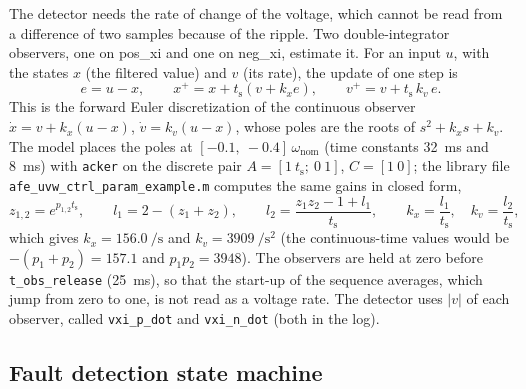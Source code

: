 \documentclass[11pt,a4paper]{scrartcl}
\newcommand{\ped}[1]{_{\mathrm{#1}}}
\newcommand{\code}[1]{\texttt{#1}}
\begin{document}
\begin{onehalfspace}
The detector needs the rate of change of the voltage, which cannot be read from a difference of two samples because of the ripple. Two double-integrator observers, one on pos\_xi and one on neg\_xi, estimate it. For an input $u$, with the states $x$ (the filtered value) and $v$ (its rate), the update of one step is
\begin{equation}
	e = u - x, \qquad x^{+} = x + t\ped{s}\left(v + k_x e\right), \qquad v^{+} = v + t\ped{s}\, k_v\, e.
	\label{eq:obs}
\end{equation}
This is the forward Euler discretization of the continuous observer $\dot{x} = v + k_x(u - x)$, $\dot{v} = k_v(u - x)$, whose poles are the roots of $s^2 + k_x s + k_v$. The model places the poles at $[-0.1,\ -0.4]\,\omega\ped{nom}$ (time constants \SI{32}{\milli\second} and \SI{8}{\milli\second}) with \code{acker} on the discrete pair $A = [1\ t\ped{s};\ 0\ 1]$, $C = [1\ 0]$; the library file \code{afe\_uvw\_ctrl\_param\_example.m} computes the same gains in closed form,
\begin{equation}
	z_{1,2} = e^{p_{1,2} t\ped{s}}, \qquad l_1 = 2 - (z_1 + z_2), \qquad l_2 = \frac{z_1 z_2 - 1 + l_1}{t\ped{s}}, \qquad k_x = \frac{l_1}{t\ped{s}}, \quad k_v = \frac{l_2}{t\ped{s}},
	\label{eq:obs_gains}
\end{equation}
which gives $k_x = \SI{156.0}{\per\second}$ and $k_v = \SI{3909}{\per\second\squared}$ (the continuous-time values would be $-(p_1 + p_2) = 157.1$ and $p_1 p_2 = 3948$). The observers are held at zero before \code{t\_obs\_release} (\SI{25}{\milli\second}), so that the start-up of the sequence averages, which jump from zero to one, is not read as a voltage rate. The detector uses $|v|$ of each observer, called \code{vxi\_p\_dot} and \code{vxi\_n\_dot} (both in the log).

\subsection{Fault detection state machine}
\label{sec:frt_sm}


\end{onehalfspace}
\end{document}
